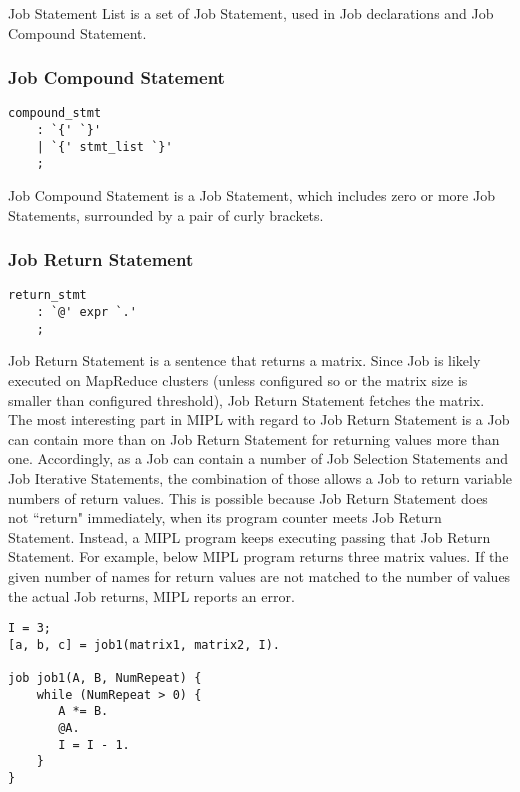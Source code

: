 \documentclass[prodmode,acmtecs]{acmsmall}
\begin{document}
Job Statement List is a set of Job Statement, used in Job
declarations and Job Compound Statement.
\medskip


\subsubsection{Job Compound Statement}

\begin{lstlisting}
compound_stmt
	: `{' `}'
	| `{' stmt_list `}'
	;
\end{lstlisting}

Job Compound Statement is a Job Statement, which includes
zero or more Job Statements, surrounded by a pair of curly
brackets.
\medskip

\subsubsection{Job Return Statement}

\begin{lstlisting}
return_stmt
	: `@' expr `.'
	;

\end{lstlisting}

Job Return Statement is a sentence that returns a matrix.  Since
Job is likely executed on MapReduce clusters (unless configured
so or the matrix size is smaller than configured threshold), Job
Return Statement fetches the matrix.  The most interesting part
in MIPL with regard to Job Return Statement is a Job can contain
more than on Job Return Statement for returning values more than
one.  Accordingly, as a Job can contain a number of Job Selection
Statements and Job Iterative Statements, the combination of those
allows a Job to return variable numbers of return values. This is
possible because Job Return Statement does not ``return" immediately,
when its program counter meets Job Return Statement.  Instead, a
MIPL program keeps executing passing that Job Return Statement.
For example, below MIPL program returns three matrix values.  If
the given number of names for return values are not matched to the
number of values the actual Job returns, MIPL reports an error.

\begin{lstlisting}
I = 3;
[a, b, c] = job1(matrix1, matrix2, I).

job job1(A, B, NumRepeat) {
    while (NumRepeat > 0) {
       A *= B.
       @A.
       I = I - 1. 
    }
}
\end{lstlisting}
\end{document}
